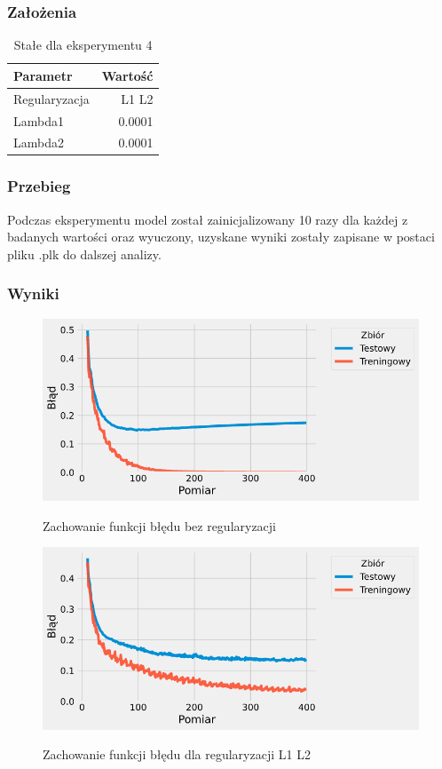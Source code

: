 \documentclass{article}
\begin{document}
\subsubsection*{Założenia}
\begin{table}[H]
	\caption{Stałe dla eksperymentu 4}
	\label{tabela-const-4}
	\centering
	\begin{tabular}{lr}
		\toprule
		Parametr      & Wartość \\
		\midrule
		Regularyzacja & L1 L2     \\
		Lambda1       & 0.0001    \\
		Lambda2       & 0.0001    \\
		\bottomrule
	\end{tabular}
\end{table}

\subsubsection*{Przebieg}

Podczas eksperymentu model został zainicjalizowany 10 razy dla każdej z badanych wartości oraz wyuczony, uzyskane wyniki zostały zapisane w postaci pliku .plk do dalszej analizy.

\subsubsection*{Wyniki}
\begin{figure}[H]
	\centering
	\caption{Zachowanie funkcji błędu bez regularyzacji}
	\includegraphics[width=\textwidth]{drop_err_0.png}
	\label{fig:res41}
\end{figure}
\begin{figure}[H]
	\centering
	\caption{Zachowanie funkcji błędu dla regularyzacji L1 L2}
	\includegraphics[width=\textwidth]{reg_err_l12.png}
	\label{fig:res42}
\end{figure}
\end{document}
